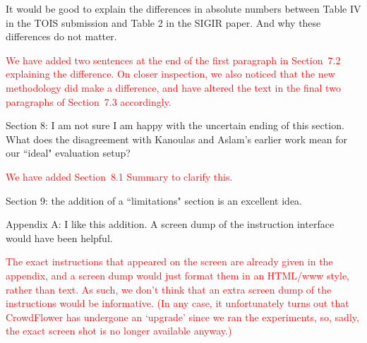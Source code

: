 \documentclass[a4paper]{article}
\newcommand{\comment}[1]{\vspace{1em} \textcolor{red}{{#1}} \vspace{1em}}
\begin{document}
It would be good to explain the differences in absolute
numbers between Table IV in the TOIS submission and Table 2 in the
SIGIR paper. And why these differences do not matter.

\comment {We have added two sentences at the end of the first paragraph in Section~7.2 
explaining the difference. On closer inspection, we also noticed that the new methodology did make a
difference, and have altered the text in the final two paragraphs of Section~7.3 accordingly.}

Section 8: I am not sure I am happy with the uncertain ending of
this section. What does the disagreement with Kanoulas and Aslam's
earlier work mean for our ``ideal" evaluation setup?

\comment{We have added Section~8.1 Summary to clarify this.}

Section 9: the addition of a ``limitations" section is an excellent
idea.

Appendix A: I like this addition. A screen dump of the instruction
interface would have been helpful.

\comment{The exact instructions that appeared on the screen are already
given in the appendix, and a screen dump would just format them in an
HTML/www style, rather than text.
As such, we don't think that an extra screen dump of the instructions
would be informative.
(In any case, it unfortunately turns out that CrowdFlower has undergone
an `upgrade' since we ran the experiments, so, sadly, the exact screen
shot is no longer available anyway.)
} 
\end{document}
